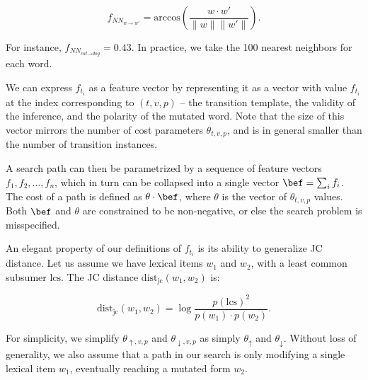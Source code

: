 \vspace{-0.5em}
\begin{equation*}
  f_{NN_{w \rightarrow w'}}
    = \textrm{arccos} \left( \frac{w \cdot w'}{\|w\| \|w'\|} \right).
\end{equation*}
\vspace{-0.5em}

For instance, $f_{NN_{\textit{cat} \rightarrow \textit{dog}}} = 0.43$.
In practice, we take the 100 nearest neighbors for each word.

We can express $f_{t_i}$ as a feature vector by representing it as
  a vector with value $f_{t_i}$ at the index corresponding to
  $(t,v,p)$ -- the transition template, the validity of the inference,
  and the polarity of the mutated word.
Note that the size of this vector mirrors the number of cost
  parameters $\theta_{t,v,p}$, and is in general smaller than the
  number of transition instances.

A search path can then be parametrized by a sequence of feature vectors
  $f_1, f_2, \dots, f_n$, which in turn can be collapsed into a single
  vector $\bef = \sum_i f_i$.
The cost of a path is defined as $\theta \cdot \bef$, where
  $\theta$ is the vector of $\theta_{t,v,p}$ values.
Both $\bef$ and $\theta$ are constrained to be non-negative, or else
  the search problem is misspecified.


%
%
An elegant property of our definitions of $f_{t_i}$ is its ability to
  generalize JC distance.
Let us assume we have lexical items $w_1$ and $w_2$, with a least common 
  subsumer $\textrm{lcs}$.
The JC distance $\textrm{dist}_{\textrm{jc}}(w_1, w_2)$ is:

\vspace{-0.5em}
\begin{equation}
\textrm{dist}_{\textrm{jc}}(w_1, w_2)
  = \log\frac{p(\textrm{lcs})^2}{p(w_1) \cdot p(w_2)}.
\label{eqn:jc}
\end{equation}
\vspace{-0.5em}

For simplicity, we simplify $\theta_{\uparrow,v,p}$ and $\theta_{\downarrow,v,p}$
  as simply $\theta_\uparrow$ and $\theta_\downarrow$.
Without loss of generality, we also assume that a path in our search
  is only modifying a single lexical item $w_1$, eventually 
  reaching a mutated form $w_2$.

